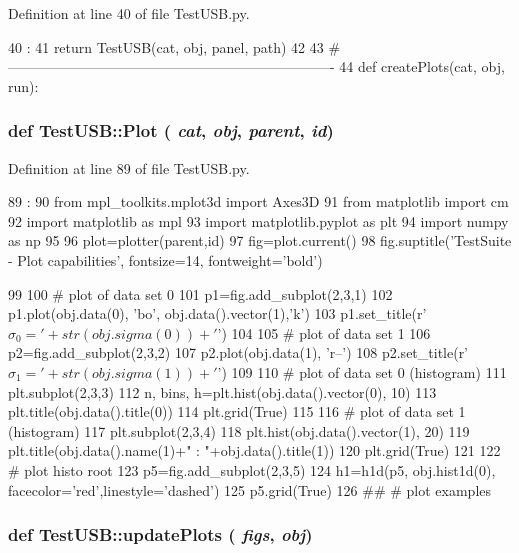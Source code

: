 Definition at line 40 of file TestUSB.py.


\begin{DoxyCode}
40                                 :
41     return TestUSB(cat, obj, panel, path)
42 
43 #----------------------------------------------------------------------
44 
def createPlots(cat, obj, run):
\end{DoxyCode}
\hypertarget{namespaceTestUSB_ac2da13ae016cb78599ea9e921006ae59}{
\subsubsection[{Plot}]{\setlength{\rightskip}{0pt plus 5cm}def TestUSB::Plot ( {\em cat}, \/   {\em obj}, \/   {\em parent}, \/   {\em id})}}
\label{namespaceTestUSB_ac2da13ae016cb78599ea9e921006ae59}


Definition at line 89 of file TestUSB.py.


\begin{DoxyCode}
89                               :
90     from mpl_toolkits.mplot3d import Axes3D
91     from matplotlib import cm
92     import matplotlib as mpl
93     import matplotlib.pyplot as plt
94     import numpy as np
95 
96     plot=plotter(parent,id)
97     fig=plot.current()
98     fig.suptitle('TestSuite - Plot capabilities', fontsize=14, fontweight='bold')
      
99     
100     # plot of data set 0
101     p1=fig.add_subplot(2,3,1)
102     p1.plot(obj.data(0), 'bo', obj.data().vector(1),'k')
103     p1.set_title(r'$\sigma_0='+str(obj.sigma(0))+'$')
104     
105     # plot of data set 1
106     p2=fig.add_subplot(2,3,2)
107     p2.plot(obj.data(1), 'r--')
108     p2.set_title(r'$\sigma_1='+str(obj.sigma(1))+'$')
109     
110     # plot of data set 0 (histogram)
111     plt.subplot(2,3,3)
112     n, bins, h=plt.hist(obj.data().vector(0), 10)
113     plt.title(obj.data().title(0))    
114     plt.grid(True)
115 
116     # plot of data set 1 (histogram)    
117     plt.subplot(2,3,4)
118     plt.hist(obj.data().vector(1), 20)
119     plt.title(obj.data().name(1)+" : "+obj.data().title(1))
120     plt.grid(True)
121 
122     # plot histo root
123     p5=fig.add_subplot(2,3,5)
124     h1=h1d(p5, obj.hist1d(0), facecolor='red',linestyle='dashed')
125     p5.grid(True)
126 
##     # plot examples
\end{DoxyCode}
\hypertarget{namespaceTestUSB_ac6a13f8454d9fcbe9c3391f1d758d5f0}{
\subsubsection[{updatePlots}]{\setlength{\rightskip}{0pt plus 5cm}def TestUSB::updatePlots ( {\em figs}, \/   {\em obj})}}
\label{namespaceTestUSB_ac6a13f8454d9fcbe9c3391f1d758d5f0}


